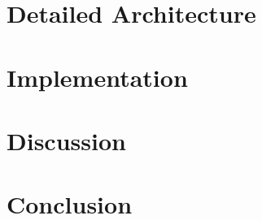 \section{Detailed Architecture}
\section{Implementation}
\section{Discussion}
\section{Conclusion}
















